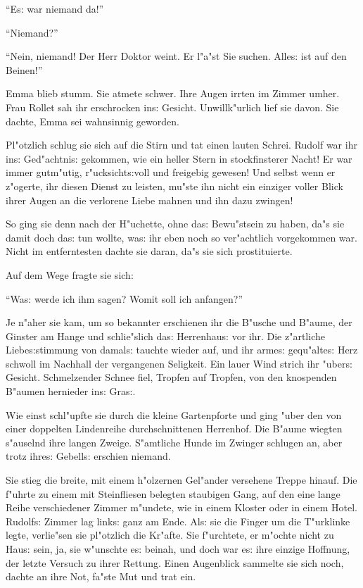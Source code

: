 \documentclass[oneside,12pt]{book}
\newcommand{\s}{s:}%
\begin{document}
"`E{\s} war niemand da!"'

"`Niemand?"'

"`Nein, niemand! Der Herr Doktor weint. Er l"a"st Sie suchen.
Alle{\s} ist auf den Beinen!"'

Emma blieb stumm. Sie atmete schwer. Ihre Augen irrten im Zimmer
umher. Frau Rollet sah ihr erschrocken in{\s} Gesicht.
Unwillk"urlich lief sie davon. Sie dachte, Emma sei wahnsinnig
geworden.

Pl"otzlich schlug sie sich auf die Stirn und tat einen lauten
Schrei. Rudolf war ihr in{\s} Ged"achtni{\s} gekommen, wie ein
heller Stern in stockfinsterer Nacht! Er war immer gutm"utig,
r"ucksicht{\s}voll und freigebig gewesen! Und selbst wenn er
z"ogerte, ihr diesen Dienst zu leisten, mu"ste ihn nicht ein
einziger voller Blick ihrer Augen an die verlorene Liebe mahnen
und ihn dazu zwingen!

So ging sie denn nach der H"uchette, ohne da{\s} Bewu"stsein zu
haben, da"s sie damit doch da{\s} tun wollte, wa{\s} ihr eben noch
so ver"achtlich vorgekommen war. Nicht im entferntesten dachte sie
daran, da"s sie sich prostituierte.


\newpage\begin{center}
{\large \so{A{ch}te{\s} Kapitel}}\bigskip\bigskip
\end{center}

Auf dem Wege fragte sie sich:

"`Wa{\s} werde ich ihm sagen? Womit soll ich anfangen?"'

Je n"aher sie kam, um so bekannter erschienen ihr die B"usche und
B"aume, der Ginster am Hange und schlie"slich da{\s} Herrenhau{\s}
vor ihr. Die z"artliche Liebe{\s}stimmung von damal{\s} tauchte
wieder auf, und ihr arme{\s} gequ"alte{\s} Herz schwoll im
Nachhall der vergangenen Seligkeit. Ein lauer Wind strich ihr
"uber{\s} Gesicht. Schmelzender Schnee fiel, Tropfen auf Tropfen,
von den knospenden B"aumen hernieder in{\s} Gra{\s}.

Wie einst schl"upfte sie durch die kleine Gartenpforte und ging
"uber den von einer doppelten Lindenreihe durchschnittenen
Herrenhof. Die B"aume wiegten s"auselnd ihre langen Zweige.
S"amtliche Hunde im Zwinger schlugen an, aber trotz ihre{\s}
Gebell{\s} erschien niemand.

Sie stieg die breite, mit einem h"olzernen Gel"ander versehene
Treppe hinauf. Die f"uhrte zu einem mit Steinfliesen belegten
staubigen Gang, auf den eine lange Reihe verschiedener Zimmer
m"undete, wie in einem Kloster oder in einem Hotel. Rudolf{\s}
Zimmer lag link{\s} ganz am Ende. Al{\s} sie die Finger um die
T"urklinke legte, verlie"sen sie pl"otzlich die Kr"afte. Sie
f"urchtete, er m"ochte nicht zu Hau{\s} sein, ja, sie w"unschte
e{\s} beinah, und doch war e{\s} ihre einzige Hoffnung, der letzte
Versuch zu ihrer Rettung. Einen Augenblick sammelte sie sich noch,
dachte an ihre Not, fa"ste Mut und trat ein.
\end{document}
